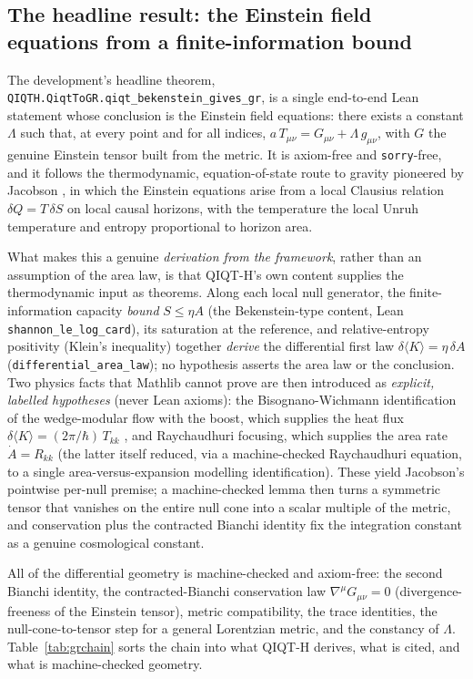 \documentclass[11pt]{article}
\begin{document}
\subsection{The headline result: the Einstein field equations from a finite-information bound}

The development's headline theorem, \texttt{QIQTH.QiqtToGR.qiqt\_bekenstein\_gives\_gr}, is a single
end-to-end Lean statement whose conclusion is the Einstein field equations: there exists a constant
$\Lambda$ such that, at every point and for all indices, $a\,T_{\mu\nu}=G_{\mu\nu}+\Lambda\,g_{\mu\nu}$,
with $G$ the genuine Einstein tensor built from the metric. It is axiom-free and \texttt{sorry}-free,
and it follows the thermodynamic, equation-of-state route to gravity pioneered by Jacobson \cite{r46},
in which the Einstein equations arise from a local Clausius relation $\delta Q=T\,\delta S$ on local
causal horizons, with the temperature the local Unruh temperature \cite{r48} and entropy proportional
to horizon area.

What makes this a genuine \emph{derivation from the framework}, rather than an assumption of the area
law, is that QIQT-H's own content supplies the thermodynamic input as theorems. Along each local null
generator, the finite-information capacity \emph{bound} $S\le\eta A$ (the Bekenstein-type content,
Lean \texttt{shannon\_le\_log\_card}), its saturation at the reference, and relative-entropy positivity
(Klein's inequality) together \emph{derive} the differential first law $\delta\langle K\rangle=\eta\,
\delta A$ (\texttt{differential\_area\_law}); no hypothesis asserts the area law or the conclusion. Two
physics facts that Mathlib cannot prove are then introduced as \emph{explicit, labelled hypotheses}
(never Lean axioms): the Bisognano-Wichmann identification of the wedge-modular flow with the boost,
which supplies the heat flux $\delta\langle K\rangle=(2\pi/\hbar)\,T_{kk}$ \cite{r47}, and Raychaudhuri
focusing, which supplies the area rate $\dot{A}=R_{kk}$ \cite{r49} (the latter itself reduced, via a
machine-checked Raychaudhuri equation, to a single area-versus-expansion modelling identification).
These yield Jacobson's pointwise per-null premise; a machine-checked lemma then turns a symmetric
tensor that vanishes on the entire null cone into a scalar multiple of the metric, and conservation
plus the contracted Bianchi identity fix the integration constant as a genuine cosmological constant.

All of the differential geometry is machine-checked and axiom-free: the second Bianchi identity, the
contracted-Bianchi conservation law $\nabla^\mu G_{\mu\nu}=0$ (divergence-freeness of the Einstein
tensor), metric compatibility, the trace identities, the null-cone-to-tensor step for a general
Lorentzian metric, and the constancy of $\Lambda$. Table~\ref{tab:grchain} sorts the chain into what
QIQT-H derives, what is cited, and what is machine-checked geometry.
\end{document}
